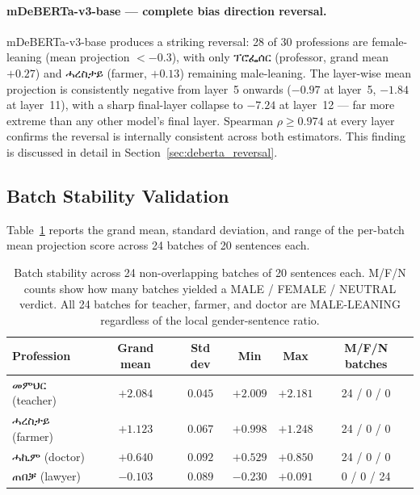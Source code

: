 \documentclass[11pt,a4paper]{article}
\begin{document}
\paragraph{mDeBERTa-v3-base — complete bias direction reversal.}
mDeBERTa-v3-base produces a striking reversal: 28 of 30 professions are
female-leaning (mean projection $< -0.3$), with only {\ethiopicfont ፕሮፌሰር}
(professor, grand mean $+0.27$) and {\ethiopicfont ሓረስታይ} (farmer, $+0.13$)
remaining male-leaning. The layer-wise mean projection is consistently negative
from layer~5 onwards ($-0.97$ at layer~5, $-1.84$ at layer~11), with a sharp
final-layer collapse to $-7.24$ at layer~12 — far more extreme than any other
model's final layer. Spearman $\rho \geq 0.974$ at every layer confirms the
reversal is internally consistent across both estimators. This finding is
discussed in detail in Section~\ref{sec:deberta_reversal}.

\subsection{Batch Stability Validation}

Table~\ref{tab:batch} reports the grand mean, standard deviation, and range
of the per-batch mean projection score across 24 batches of 20 sentences each.

\begin{table}[h]
\centering
\small
\begin{tabular}{lccccc}
\toprule
\textbf{Profession} & \textbf{Grand mean} & \textbf{Std dev} & \textbf{Min} & \textbf{Max} & \textbf{M/F/N batches} \\
\midrule
{\ethiopicfont መምህር} (teacher)  & $+2.084$ & $0.045$ & $+2.009$ & $+2.181$ & 24 / 0 / 0 \\
{\ethiopicfont ሓረስታይ} (farmer) & $+1.123$ & $0.067$ & $+0.998$ & $+1.248$ & 24 / 0 / 0 \\
{\ethiopicfont ሓኪም}  (doctor)  & $+0.640$ & $0.092$ & $+0.529$ & $+0.850$ & 24 / 0 / 0 \\
{\ethiopicfont ጠበቓ}  (lawyer)  & $-0.103$ & $0.089$ & $-0.230$ & $+0.091$ &  0 / 0 / 24 \\
\bottomrule
\end{tabular}
\caption{Batch stability across 24 non-overlapping batches of 20 sentences each.
M/F/N counts show how many batches yielded a MALE / FEMALE / NEUTRAL verdict.
All 24 batches for teacher, farmer, and doctor are MALE-LEANING regardless of
the local gender-sentence ratio.}
\label{tab:batch}
\end{table}
\end{document}
